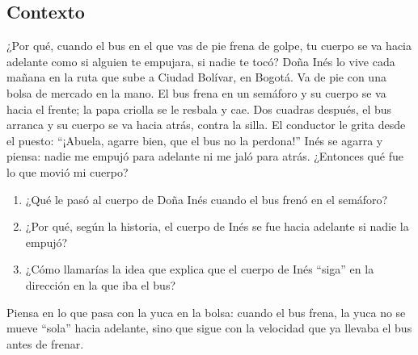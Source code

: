 \documentclass[
  spanish,
  letterpaper,
  12pt,
  oneside,
  open=any,
  DIV=15]{scrbook}
\providecommand{\tightlist}{%
  \setlength{\itemsep}{0pt}\setlength{\parskip}{0pt}}
\begin{document}
\subsection{Contexto}\label{contexto-1}

¿Por qué, cuando el bus en el que vas de pie frena de golpe, tu cuerpo
se va hacia adelante como si alguien te empujara, si nadie te tocó? Doña
Inés lo vive cada mañana en la ruta que sube a Ciudad Bolívar, en
Bogotá. Va de pie con una bolsa de mercado en la mano. El bus frena en
un semáforo y su cuerpo se va hacia el frente; la papa criolla se le
resbala y cae. Dos cuadras después, el bus arranca y su cuerpo se va
hacia atrás, contra la silla. El conductor le grita desde el puesto:
``¡Abuela, agarre bien, que el bus no la perdona!'' Inés se agarra y
piensa: nadie me empujó para adelante ni me jaló para atrás. ¿Entonces
qué fue lo que movió mi cuerpo?

\begin{tcolorbox}[enhanced jigsaw, arc=.35mm, bottomrule=.15mm, bottomtitle=1mm, breakable, colback=white, colbacktitle=quarto-callout-note-color!10!white, colframe=quarto-callout-note-color-frame, coltitle=black, left=2mm, leftrule=.75mm, opacityback=0, opacitybacktitle=0.6, rightrule=.15mm, title=\textcolor{quarto-callout-note-color}{\faInfo}\hspace{0.5em}{Reflexiona y Conecta (Preguntas de Comprensión)}, titlerule=0mm, toprule=.15mm, toptitle=1mm]

\begin{enumerate}
\def\labelenumi{\arabic{enumi}.}
\tightlist
\item
  ¿Qué le pasó al cuerpo de Doña Inés cuando el bus frenó en el
  semáforo?
\item
  ¿Por qué, según la historia, el cuerpo de Inés se fue hacia adelante
  si nadie la empujó?
\item
  ¿Cómo llamarías la idea que explica que el cuerpo de Inés ``siga'' en
  la dirección en la que iba el bus?
\end{enumerate}

\end{tcolorbox}

\begin{tcolorbox}[enhanced jigsaw, arc=.35mm, bottomrule=.15mm, bottomtitle=1mm, breakable, colback=white, colbacktitle=quarto-callout-tip-color!10!white, colframe=quarto-callout-tip-color-frame, coltitle=black, left=2mm, leftrule=.75mm, opacityback=0, opacitybacktitle=0.6, rightrule=.15mm, title=\textcolor{quarto-callout-tip-color}{\faLightbulb}\hspace{0.5em}{Apoyo Procedimental (Pista)}, titlerule=0mm, toprule=.15mm, toptitle=1mm]

Piensa en lo que pasa con la yuca en la bolsa: cuando el bus frena, la
yuca no se mueve ``sola'' hacia adelante, sino que sigue con la
velocidad que ya llevaba el bus antes de frenar.

\end{tcolorbox}
\end{document}
